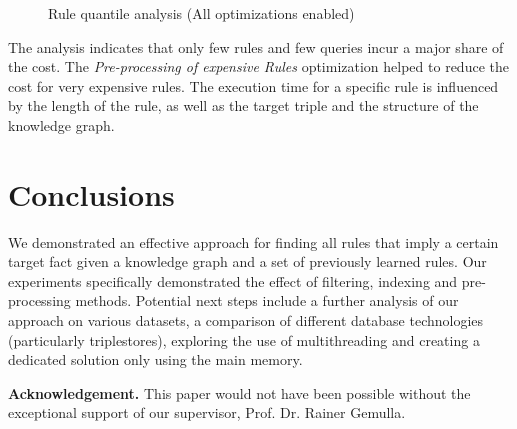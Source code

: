 \documentclass[english]{lni}
\begin{document}
\begin{figure}[t]
\caption{Rule quantile analysis (All optimizations enabled)}
\end{figure}

The analysis indicates that only few rules and few queries incur a major share of the cost. The \textit{Pre-processing of expensive Rules} optimization helped to reduce the cost for very expensive rules. The execution time for a specific rule is influenced by the length of the rule, as well as the target triple and the structure of the knowledge graph.






\section{Conclusions}

%
%

We demonstrated an effective approach for finding all rules that imply a certain target fact given a knowledge graph and a set of previously learned rules. Our experiments specifically demonstrated the effect of filtering, indexing and pre-processing methods. Potential next steps include a further analysis of our approach on various datasets, a comparison of different database technologies (particularly triplestores), exploring the use of multithreading and creating a dedicated solution only using the main memory.

\textbf{Acknowledgement.} This paper would not have been possible without the exceptional support of our supervisor, Prof. Dr. Rainer Gemulla.

\end{document}
